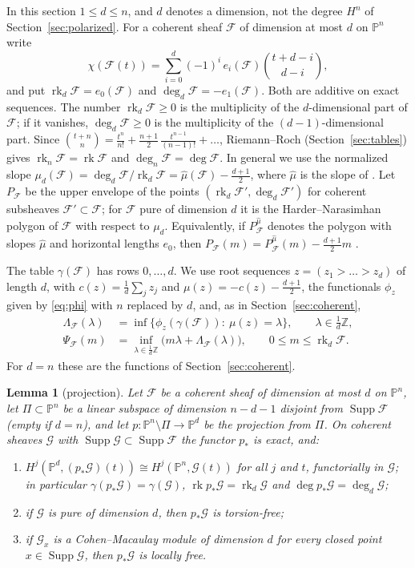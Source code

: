 \documentclass[11pt]{amsart}
\newtheorem{lemma}[theorem]{Lemma}
\theoremstyle{definition}
\theoremstyle{remark}
\newcommand{\PP}{\mathbb{P}}
\newcommand{\ZZ}{\mathbb{Z}}
\newcommand{\cF}{\mathcal{F}}
\DeclareMathOperator{\rk}{rk}
\begin{document}
In this section $1\le d\le n$, and $d$ denotes a dimension, not the degree $H^n$ of Section~\ref{sec:polarized}. For a coherent sheaf $\cF$ of dimension at most $d$ on $\PP^n$ write
\[
\chi(\cF(t))=\sum_{i=0}^d(-1)^i\,e_i(\cF)\binom{t+d-i}{d-i},
\]
and put $\rk_d\cF=e_0(\cF)$ and $\deg_d\cF=-e_1(\cF)$. Both are additive on exact sequences. The number $\rk_d\cF\ge0$ is the multiplicity of the $d$-dimensional part of $\cF$; if it vanishes, $\deg_d\cF\ge0$ is the multiplicity of the $(d-1)$-dimensional part. Since $\binom{t+n}n=\frac{t^n}{n!}+\frac{n+1}2\,\frac{t^{n-1}}{(n-1)!}+\dots$, Riemann--Roch (Section~\ref{sec:tables}) gives $\rk_n\cF=\rk\cF$ and $\deg_n\cF=\deg\cF$. In general we use the normalized slope $\mu_d(\cF)=\deg_d\cF/\rk_d\cF=\hat\mu(\cF)-\frac{d+1}2$, where $\hat\mu$ is the slope of \cite[\S1.6]{HL10}. Let $P_\cF$ be the upper envelope of the points $(\rk_d\cF',\deg_d\cF')$ for coherent subsheaves $\cF'\subset\cF$; for $\cF$ pure of dimension $d$ it is the Harder--Narasimhan polygon of $\cF$ with respect to $\mu_d$. Equivalently, if $P^{\hat\mu}_{\cF}$ denotes the polygon with slopes $\hat\mu$ and horizontal lengths $e_0$, then $P_\cF(m)=P^{\hat\mu}_\cF(m)-\frac{d+1}2m$ \cite[\S1.6]{HL10}.

The table $\gamma(\cF)$ has rows $0,\dots,d$. We use root sequences $z=(z_1>\dots>z_d)$ of length $d$, with $c(z)=\frac1d\sum_jz_j$ and $\mu(z)=-c(z)-\frac{d+1}2$, the functionals $\phi_z$ given by \eqref{eq:phi} with $n$ replaced by $d$, and, as in Section~\ref{sec:coherent},
\begin{align*}
\Lambda_\cF(\lambda)&=\inf\big\{\phi_z(\gamma(\cF)):\ \mu(z)=\lambda\big\},\qquad \lambda\in\tfrac1d\ZZ,\\
\Psi_\cF(m)&=\inf_{\lambda\in\frac1d\ZZ}\big(m\lambda+\Lambda_\cF(\lambda)\big),\qquad 0\le m\le\rk_d\cF .
\end{align*}
For $d=n$ these are the functions of Section~\ref{sec:coherent}.

\begin{lemma}[projection]\label{lem:projection}
Let $\cF$ be a coherent sheaf of dimension at most $d$ on $\PP^n$, let $\Pi\subset\PP^n$ be a linear subspace of dimension $n-d-1$ disjoint from $\operatorname{Supp}\cF$ (empty if $d=n$), and let $p\colon\PP^n\setminus\Pi\to\PP^d$ be the projection from $\Pi$. On coherent sheaves $\mathcal G$ with $\operatorname{Supp}\mathcal G\subset\operatorname{Supp}\cF$ the functor $p_*$ is exact, and:
\begin{enumerate}[label=\textup{(\roman*)}]
\item $H^j(\PP^d,(p_*\mathcal G)(t))\cong H^j(\PP^n,\mathcal G(t))$ for all $j$ and $t$, functorially in $\mathcal G$; in particular $\gamma(p_*\mathcal G)=\gamma(\mathcal G)$, $\rk p_*\mathcal G=\rk_d\mathcal G$ and $\deg p_*\mathcal G=\deg_d\mathcal G$;
\item if $\mathcal G$ is pure of dimension $d$, then $p_*\mathcal G$ is torsion-free;
\item if $\mathcal G_x$ is a Cohen--Macaulay module of dimension $d$ for every closed point $x\in\operatorname{Supp}\mathcal G$, then $p_*\mathcal G$ is locally free.
\end{enumerate}
\end{lemma}
\end{document}
